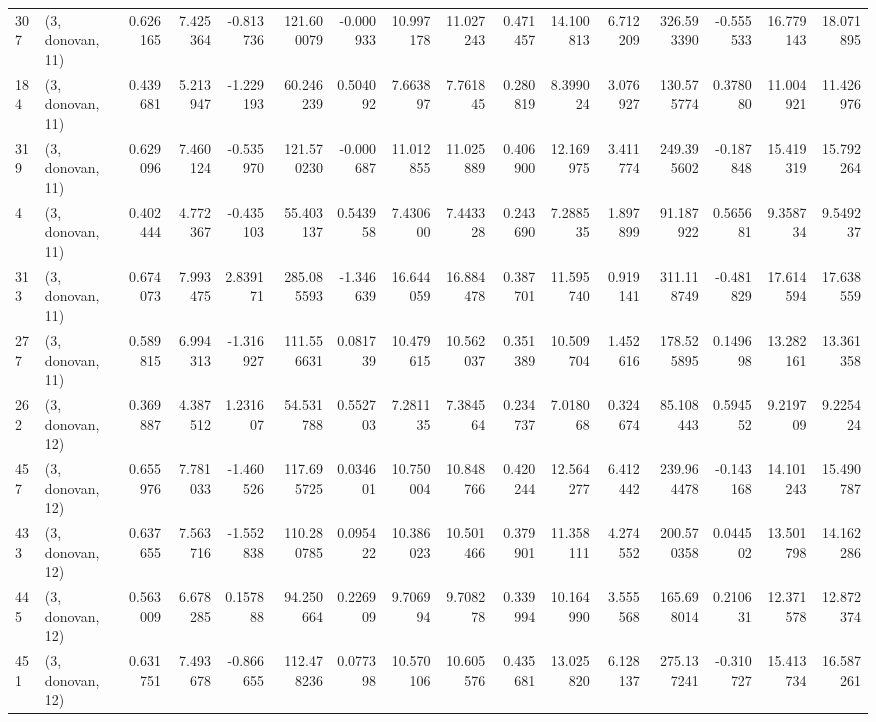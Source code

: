 \begin{tabular}{llrrrrrrrrrrrrrr}
307 &  (3, donovan, 11) &   0.626165 &   7.425364 &  -0.813736 &   121.600079 &  -0.000933 &  10.997178 &  11.027243 &  0.471457 &  14.100813 &   6.712209 &    326.593390 &   -0.555533 &   16.779143 &   18.071895 \\
184 &  (3, donovan, 11) &   0.439681 &   5.213947 &  -1.229193 &    60.246239 &   0.504092 &   7.663897 &   7.761845 &  0.280819 &   8.399024 &   3.076927 &    130.575774 &    0.378080 &   11.004921 &   11.426976 \\
319 &  (3, donovan, 11) &   0.629096 &   7.460124 &  -0.535970 &   121.570230 &  -0.000687 &  11.012855 &  11.025889 &  0.406900 &  12.169975 &   3.411774 &    249.395602 &   -0.187848 &   15.419319 &   15.792264 \\
4   &  (3, donovan, 11) &   0.402444 &   4.772367 &  -0.435103 &    55.403137 &   0.543958 &   7.430600 &   7.443328 &  0.243690 &   7.288535 &   1.897899 &     91.187922 &    0.565681 &    9.358734 &    9.549237 \\
313 &  (3, donovan, 11) &   0.674073 &   7.993475 &   2.839171 &   285.085593 &  -1.346639 &  16.644059 &  16.884478 &  0.387701 &  11.595740 &   0.919141 &    311.118749 &   -0.481829 &   17.614594 &   17.638559 \\
277 &  (3, donovan, 11) &   0.589815 &   6.994313 &  -1.316927 &   111.556631 &   0.081739 &  10.479615 &  10.562037 &  0.351389 &  10.509704 &   1.452616 &    178.525895 &    0.149698 &   13.282161 &   13.361358 \\
262 &  (3, donovan, 12) &   0.369887 &   4.387512 &   1.231607 &    54.531788 &   0.552703 &   7.281135 &   7.384564 &  0.234737 &   7.018068 &   0.324674 &     85.108443 &    0.594552 &    9.219709 &    9.225424 \\
457 &  (3, donovan, 12) &   0.655976 &   7.781033 &  -1.460526 &   117.695725 &   0.034601 &  10.750004 &  10.848766 &  0.420244 &  12.564277 &   6.412442 &    239.964478 &   -0.143168 &   14.101243 &   15.490787 \\
433 &  (3, donovan, 12) &   0.637655 &   7.563716 &  -1.552838 &   110.280785 &   0.095422 &  10.386023 &  10.501466 &  0.379901 &  11.358111 &   4.274552 &    200.570358 &    0.044502 &   13.501798 &   14.162286 \\
445 &  (3, donovan, 12) &   0.563009 &   6.678285 &   0.157888 &    94.250664 &   0.226909 &   9.706994 &   9.708278 &  0.339994 &  10.164990 &   3.555568 &    165.698014 &    0.210631 &   12.371578 &   12.872374 \\
451 &  (3, donovan, 12) &   0.631751 &   7.493678 &  -0.866655 &   112.478236 &   0.077398 &  10.570106 &  10.605576 &  0.435681 &  13.025820 &   6.128137 &    275.137241 &   -0.310727 &   15.413734 &   16.587261 \\

\end{tabular}
